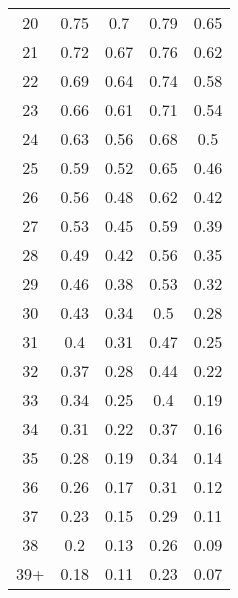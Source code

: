 \documentclass{svjour3}
\begin{document}
\begin{table}[htbp]
\begin{tabular}{p{4.215em}cccc}
    \multicolumn{1}{c}{20} & 0.75  & 0.7   & 0.79  & 0.65 \\
    \multicolumn{1}{c}{21} & 0.72  & 0.67  & 0.76  & 0.62 \\
    \multicolumn{1}{c}{22} & 0.69  & 0.64  & 0.74  & 0.58 \\
    \multicolumn{1}{c}{23} & 0.66  & 0.61  & 0.71  & 0.54 \\
    \multicolumn{1}{c}{24} & 0.63  & 0.56  & 0.68  & 0.5 \\
    \multicolumn{1}{c}{25} & 0.59  & 0.52  & 0.65  & 0.46 \\
    \multicolumn{1}{c}{26} & 0.56  & 0.48  & 0.62  & 0.42 \\
    \multicolumn{1}{c}{27} & 0.53  & 0.45  & 0.59  & 0.39 \\
    \multicolumn{1}{c}{28} & 0.49  & 0.42  & 0.56  & 0.35 \\
    \multicolumn{1}{c}{29} & 0.46  & 0.38  & 0.53  & 0.32 \\
    \multicolumn{1}{c}{30} & 0.43  & 0.34  & 0.5   & 0.28 \\
    \multicolumn{1}{c}{31} & 0.4   & 0.31  & 0.47  & 0.25 \\
    \multicolumn{1}{c}{32} & 0.37  & 0.28  & 0.44  & 0.22 \\
    \multicolumn{1}{c}{33} & 0.34  & 0.25  & 0.4   & 0.19 \\
    \multicolumn{1}{c}{34} & 0.31  & 0.22  & 0.37  & 0.16 \\
    \multicolumn{1}{c}{35} & 0.28  & 0.19  & 0.34  & 0.14 \\
    \multicolumn{1}{c}{36} & 0.26  & 0.17  & 0.31  & 0.12 \\
    \multicolumn{1}{c}{37} & 0.23  & 0.15  & 0.29  & 0.11 \\
    \multicolumn{1}{c}{38} & 0.2   & 0.13  & 0.26  & 0.09 \\
    \multicolumn{1}{c}{39+}   & 0.18  & 0.11  & 0.23  & 0.07 \\
    \bottomrule
    \end{tabular}%
  \label{tab:addlabel}%
\end{table}%
\end{document}
